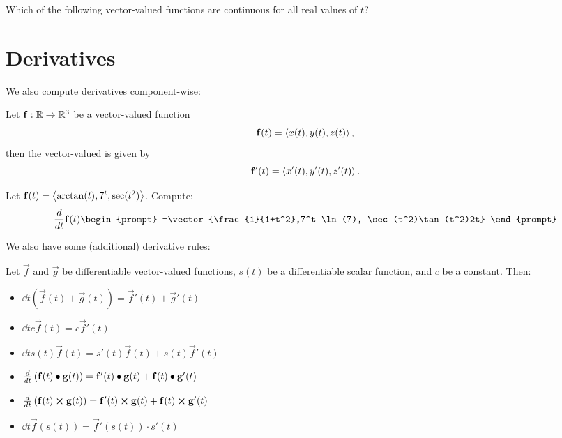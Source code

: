 \documentclass{ximera}
\begin{document}
\begin{question}
Which of the following vector-valued functions are continuous for all
real values of $t$?
\begin{selectAll}
\end{selectAll}
\end{question}


\section{Derivatives}

We also compute derivatives component-wise:

\begin{definition}
  Let $\mathbf{f}:\mathbb R \to \mathbb R^3$ be a vector-valued function
  \[
  \mathbf{f}(t) = \left\langle x(t),y(t),z(t)\right\rangle,
  \]
  then the vector-valued  is given by
  \[
  \mathbf{f}'(t) = \left\langle x'(t),y'(t),z'(t)\right\rangle.
  \]
\end{definition}

\begin{question}
  Let $\mathbf{f}(t) = \left\langle \arctan(t),7^t, \sec(t^2)\right\rangle$.
  Compute:
  \[
  \dd{t} \vec{f}(t)
  \begin{prompt}
    =\vector{\frac{1}{1+t^2},7^t \ln(7), \sec(t^2)\tan(t^2)2t}
  \end{prompt}
  \]
\end{question}

We also have some (additional) derivative rules:
\begin{theorem}
  Let $\vec{f}$ and $\vec{g}$ be differentiable vector-valued
  functions, $s(t)$ be a differentiable scalar function, and $c$ be a
  constant. Then:
  \begin{itemize}
  \item $\dd{t} \left(\vec{f}(t) + \vec{g}(t) \right) = \vec{f}'(t) + \vec{g}'(t)$
  \item $\dd{t} c\vec{f}(t) = c\vec{f}'(t)$
  \item $\dd{t} s(t)\vec{f}(t) = s'(t)\vec{f}(t) + s(t)\vec{f}'(t)$
  \item $\frac{\mathop{}\!d }{\mathop{}\!d t} \left(\mathbf{f}(t)\bullet \mathbf{g}(t)\right) = \mathbf{f}'(t)\bullet \mathbf{g}(t) + \mathbf{f}(t)\bullet\mathbf{g}'(t)$
  \item $\frac{\mathop{}\!d }{\mathop{}\!d t} \left(\mathbf{f}(t)\boldsymbol\times \mathbf{g}(t)\right) = \mathbf{f}'(t)\boldsymbol\times \mathbf{g}(t) + \mathbf{f}(t)\boldsymbol\times\mathbf{g}'(t)$
  \item $\dd{t} \vec{f}(s(t)) = \vec{f}'(s(t))\cdot s'(t)$
  \end{itemize}
\end{theorem}
\end{document}
